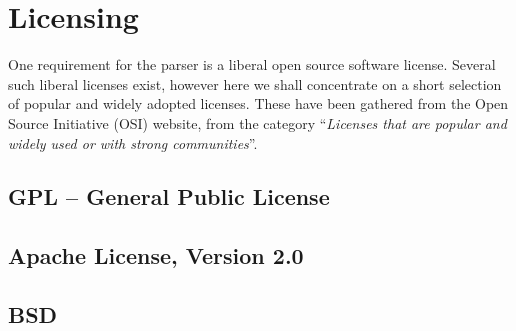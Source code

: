 \section{Licensing}
\label{sect:method:licensing}
One requirement for the parser is a liberal open source software license.
Several such liberal licenses exist, however here we shall concentrate on a
short selection of popular and widely adopted licenses. These have been gathered
from the Open Source Initiative (OSI) website\cite{osi_website}, from the
category
``\emph{Licenses that are popular and widely used or with strong communities}''.
\subsection{GPL -- General Public License}
\subsection{Apache License, Version 2.0}
\subsection{BSD}


